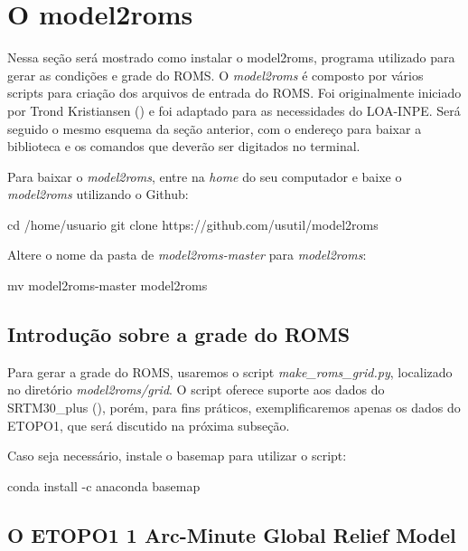 \section{O model2roms}\label{model2romssec}
\bigskip

\noindent Nessa seção será mostrado como instalar o model2roms, programa utilizado para gerar as condições e grade do ROMS. O \textit{model2roms} é composto por vários scripts para criação dos arquivos de entrada do ROMS. Foi originalmente iniciado por Trond Kristiansen (\textcolor{bleu_cite}{\cite{Trond2019}}) e foi adaptado para as necessidades do LOA-INPE. Será seguido o mesmo esquema da seção anterior, com o endereço para baixar a biblioteca e os comandos que deverão ser digitados no terminal.
\bigskip

\noindent Para baixar o \textit{model2roms}, entre na \textit{home} do seu computador e baixe o \textit{model2roms} utilizando o Github:
\bigskip

\begin{bashcode}
cd /home/usuario
git clone https://github.com/usutil/model2roms
\end{bashcode}
\bigskip

\noindent Altere o nome da pasta de \textit{model2roms-master} para \textit{model2roms}:
\bigskip

\begin{bashcode}
mv model2roms-master model2roms
\end{bashcode}
\bigskip

\subsection{Introdução sobre a grade do ROMS}
\bigskip

\noindent Para gerar a grade do ROMS, usaremos o script \textit{make\_roms\_grid.py}, localizado no diretório \textit{model2roms/grid}.  O script oferece suporte aos dados do SRTM30\_plus (\cite{Becker2009}), porém, para fins práticos, exemplificaremos apenas os dados do ETOPO1, que será discutido na próxima subseção.
\bigskip

\noindent Caso seja necessário, instale o basemap para utilizar o script:
\bigskip

\begin{bashcode}
conda install -c anaconda basemap
\end{bashcode}
\bigskip

\subsection{O ETOPO1 1 Arc-Minute Global Relief Model}
\bigskip

